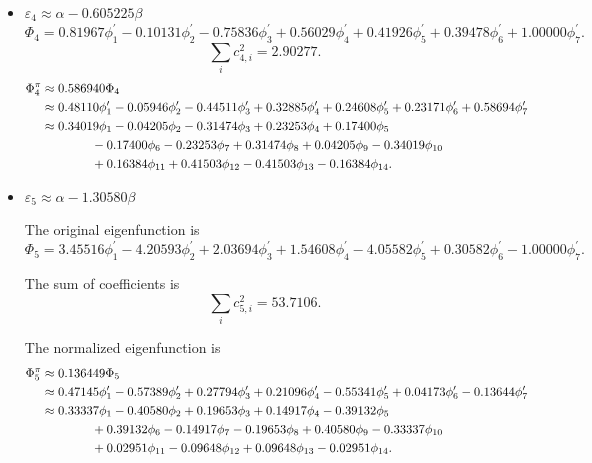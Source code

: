 \documentclass[a4paper]{book}
\begin{document}
\begin{solution}
\begin{enumerate}[label=(\alph*)]
\begin{itemize}
		
		\item $\varepsilon_4 \approx \alpha - 0.605225 \beta$
		\begin{equation*}
			\Phi_4 = 0.81967 \phi^\prime_1 -0.10131 \phi^\prime_2 -0.75836 \phi^\prime_3 + 0.56029 \phi^\prime_4 + 0.41926 \phi^\prime_5 + 0.39478 \phi^\prime_6 + 1.00000 \phi^\prime_7.
		\end{equation*}
		\begin{equation*}
			\sum_{i} c^2_{4,i} = 2.90277.
		\end{equation*}
		\begin{align}
			\Phi^\pi_4 &\approx 0.586940 \Phi_4 \notag \\
			&\approx 0.48110 \phi^\prime_1 - 0.05946 \phi^\prime_2 -0.44511 \phi^\prime_3 +0.32885 \phi^\prime_4 + 0.24608 \phi^\prime_5 + 0.23171 \phi^\prime_6 + 0.58694 \phi^\prime_7 \notag \\
			&\approx 0.34019 \phi_1 -0.04205 \phi_2 -0.31474 \phi_3 + 0.23253 \phi_4 + 0.17400 \phi_5  \notag \\
			&\hspace*{4em} -0.17400 \phi_6 -0.23253 \phi_7 +0.31474 \phi_8 +0.04205 \phi_9 -0.34019 \phi_{10} \notag \\
			&\hspace*{4em} +0.16384 \phi_{11} + 0.41503 \phi_{12} -0.41503 \phi_{13} -0.16384\phi_{14} .
		\end{align}
		
		
		\item $\varepsilon_5 \approx \alpha -1.30580 \beta$
		
		The original eigenfunction is
		\begin{equation*}
			\Phi_5 = 3.45516 \phi^\prime_1 - 4.20593 \phi^\prime_2 + 2.03694 \phi^\prime_3 + 1.54608 \phi^\prime_4 - 4.05582 \phi^\prime_5 + 0.30582 \phi^\prime_6 - 1.00000 \phi^\prime_7.
		\end{equation*}
		
		The sum of coefficients is
		\begin{equation*}
			\sum_{i} c^2_{5,i} = 53.7106.
		\end{equation*}
		
		The normalized eigenfunction is
		\begin{align}
			\Phi^\pi_5 &\approx 0.136449 \Phi_5 \notag \\
			&\approx 0.47145 \phi^\prime_1 -0.57389 \phi^\prime_2 +0.27794 \phi^\prime_3 + 0.21096 \phi^\prime_4 - 0.55341 \phi^\prime_5 + 0.04173 \phi^\prime_6 - 0.13644 \phi^\prime_7\\
			&\approx 0.33337 \phi_1 -0.40580 \phi_2 +0.19653 \phi_3 + 0.14917 \phi_4 - 0.39132 \phi_5  \notag \\
			&\hspace*{4em} +0.39132 \phi_6 -0.14917 \phi_7 -0.19653 \phi_8 +0.40580 \phi_9 -0.33337 \phi_{10} \notag \\
			&\hspace*{4em} + 0.02951 \phi_{11} - 0.09648 \phi_{12} + 0.09648 \phi_{13} - 0.02951 \phi_{14} .
		\end{align}
		

\end{itemize}
\end{enumerate}
\end{solution}
\end{document}
